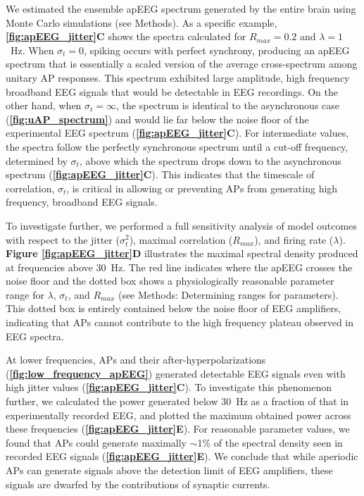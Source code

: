 We estimated the ensemble apEEG spectrum generated by the entire brain using Monte Carlo simulations (see Methods). As a specific example, \textbf{\autoref{fig:apEEG_jitter}C} shows the spectra calculated for $R_{max}=0.2$ and $\lambda=1$~\unit{\hertz}. When $\sigma_t=0$, spiking occurs with perfect synchrony, producing an apEEG spectrum that is essentially a scaled version of the average cross-spectrum among unitary AP responses. This spectrum exhibited large amplitude, high frequency broadband EEG signals that would be detectable in EEG recordings. On the other hand, when $\sigma_t=\infty$, the spectrum is identical to the asynchronous case (\textbf{\autoref{fig:uAP_spectrum}}) and would lie far below the noise floor of the experimental EEG spectrum (\textbf{\autoref{fig:apEEG_jitter}C}). For intermediate values, the spectra follow the perfectly synchronous spectrum until a cut-off frequency, determined by $\sigma_t$, above which the spectrum drops down to the asynchronous spectrum (\textbf{\autoref{fig:apEEG_jitter}C}). This indicates that the timescale of correlation, $\sigma_t$, is critical in allowing or preventing APs from generating high frequency, broadband EEG signals.

To investigate further, we performed a full sensitivity analysis of model outcomes with respect to the jitter ($\sigma_t^2$), maximal correlation ($R_{max}$), and firing rate ($\lambda$). \textbf{Figure \ref{fig:apEEG_jitter}D} illustrates the maximal spectral density produced at frequencies above 30~\unit{\hertz}. The red line indicates where the apEEG crosses the noise floor and the dotted box shows a physiologically reasonable parameter range for $\lambda$,  $\sigma_t$, and $R_{max}$ (see Methods: Determining ranges for parameters). This dotted box is entirely contained below the noise floor of EEG amplifiers, indicating that APs cannot contribute to the high frequency plateau observed in EEG spectra.

At lower frequencies, APs and their after-hyperpolarizations (\textbf{\autoref{fig:low_frequency_apEEG}}) generated detectable EEG signals even with high jitter values (\textbf{\autoref{fig:apEEG_jitter}C}). To investigate this phenomenon further, we calculated the power generated below 30~\unit{\hertz} as a fraction of that in experimentally recorded EEG, and plotted the maximum obtained power across these frequencies (\textbf{\autoref{fig:apEEG_jitter}E}). For reasonable parameter values, we found that APs could generate maximally ${\sim}$1\% of the spectral density seen in recorded EEG signals (\textbf{\autoref{fig:apEEG_jitter}E}). We conclude that while aperiodic APs can generate signals above the detection limit of EEG amplifiers, these signals are dwarfed by the contributions of synaptic currents.

